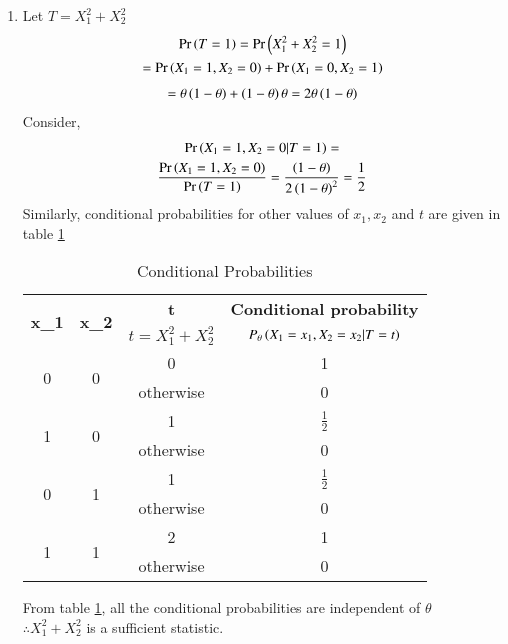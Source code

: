 \documentclass[journal,12pt,twocolumn]{IEEEtran}
\begin{document}
\begin{enumerate}
    \item Let $T=X_1^2+X_2^2$
    \begin{multline}
        \Pr\left(T=1\right)=\Pr\left(X_1^2+X_2^2=1\right)\\=\Pr\left(X_1=1,X_2=0\right)+\Pr\left(X_1=0,X_2=1\right)
    \end{multline}
     \begin{align}
        =\theta \left(1-\theta\right) + \left(1-\theta\right)\theta  = 2\theta \left(1-\theta\right)
    \end{align}
    Consider,
    \begin{multline}
        \Pr\left(X_1=1,X_2=0 | T=1\right) = \\\frac{\Pr\left(X_1=1,X_2=0\right)}{\Pr\left(T=1\right)}
        =\frac{\left(1-\theta\right)}{2\left(1-\theta\right)^2}=\frac{1}{2}
    \end{multline}
    Similarly, conditional probabilities for other values of $x_1,x_2$ and $t$ are given in table \ref{table2}
    \begin{table}[h!]
    \begin{tabular}[width=\columnwidth]{|c|c|c|c|}
         \hline
        \multirow{2}{*}{\textbf{x_1}} & \multirow{2}{*}{\textbf{x_2}} & \textbf{t} & \textbf{Conditional probability}  \\
        & & $t=X_1^2+X_2^2$ & $P_\theta\left(X_1=x_1,X_2=x_2|T=t\right)$\\
        \hline
        \multirow{2}{*}{0} & \multirow{2}{*}{0} & 0 & 1\\ 
        & & otherwise & 0 \\ 
        \hline
        \multirow{2}{*}{1} & \multirow{2}{*}{0} & 1 & $\frac{1}{2}$\\ 
        & & otherwise & 0 \\ 
        \hline
        \multirow{2}{*}{0} & \multirow{2}{*}{1} & 1 & $\frac{1}{2}$\\ 
        & & otherwise & 0 \\ 
        \hline
        \multirow{2}{*}{1} & \multirow{2}{*}{1} & 2 & 1\\ 
        & & otherwise & 0 \\        
        \hline
    \end{tabular}
    \caption{Conditional Probabilities}
    \label{table2}
    \end{table}  
    
    From table \ref{table2}, all the conditional probabilities are independent of $\theta$\\ $\therefore X_1^2+X_2^2$ is a sufficient statistic.
    

\end{enumerate}
\end{document}
